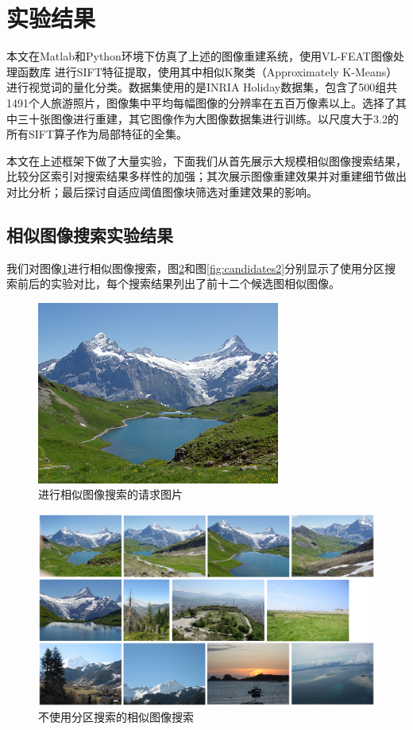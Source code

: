 \section{实验结果}
本文在Matlab和Python环境下仿真了上述的图像重建系统，使用VL-FEAT图像处理函数库
\cite{vl_feat}进行SIFT特征提取，使用其中相似K聚类（Approximately K-Means）进行视觉词的量化分类。数据集使用的是INRIA Holiday数据集\cite{INRIA}，包含了500组共1491个人旅游照片，图像集中平均每幅图像的分辨率在五百万像素以上。选择了其中三十张图像进行重建，其它图像作为大图像数据集进行训练。以尺度大于3.2的所有SIFT算子作为局部特征的全集。

本文在上述框架下做了大量实验，下面我们从首先展示大规模相似图像搜索结果，比较分区索引对搜索结果多样性的加强；其次展示图像重建效果并对重建细节做出对比分析；最后探讨自适应阈值图像块筛选对重建效果的影响。

\subsection{相似图像搜索实验结果}
我们对图像\ref{fig:candi_query}进行相似图像搜索，图\ref{fig:candidates1}和图\ref{fig:candidates2}分别显示了使用分区搜索前后的实验对比，每个搜索结果列出了前十二个候选图相似图像。
\begin{figure}
\centering\includegraphics[width=8cm]{imgs/ch4/candi_query}
\caption{进行相似图像搜索的请求图片}
\label{fig:candi_query}
\end{figure}

\begin{figure}
\centering\includegraphics[width=15cm]{imgs/ch4/candidates1}
\caption{不使用分区搜索的相似图像搜索}
\label{fig:candidates1}
\end{figure}

